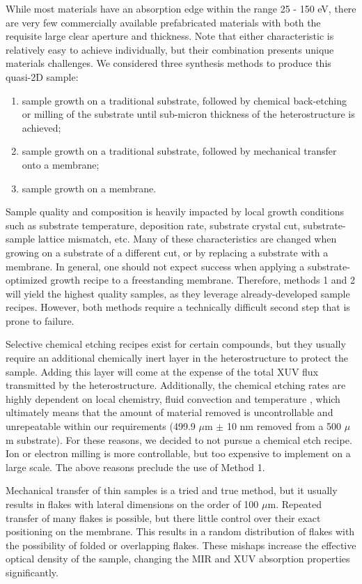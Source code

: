 While most materials have an absorption edge within the range 25 - 150 eV, there are very few commercially available prefabricated materials with both the requisite large clear aperture and thickness. Note that either characteristic is relatively easy to achieve individually, but their combination presents unique materials challenges. We considered three synthesis methods to produce this quasi-2D sample:
\begin{enumerate}
	\item sample growth on a traditional substrate, followed by chemical back-etching or milling of the substrate until sub-micron thickness of the heterostructure is achieved;
	\item sample growth on a traditional substrate, followed by mechanical transfer onto a membrane;
	\item sample growth on a membrane.
\end{enumerate}
Sample quality and composition is heavily impacted by local growth conditions such as substrate temperature, deposition rate, substrate crystal cut, substrate-sample lattice mismatch, etc. Many of these characteristics are changed when growing on a substrate of a different cut, or by replacing a substrate with a membrane. In general, one should not expect success when applying a substrate-optimized growth recipe to a freestanding membrane. Therefore, methods 1 and 2 will yield the highest quality samples, as they leverage already-developed sample recipes. However, both methods require a technically difficult second step that is prone to failure.

Selective chemical etching recipes exist for certain compounds, but they usually require an additional chemically inert layer in the heterostructure to protect the sample. Adding this layer will come at the expense of the total XUV flux transmitted by the heterostructure. Additionally, the chemical etching rates are highly dependent on local chemistry, fluid convection and temperature \cite{chiuPhotoluminescenceEvolutionGaAs2015}, which ultimately means that the amount of material removed is uncontrollable and unrepeatable within our requirements (499.9 $\mu$m $\pm$ 10 nm removed from a 500 $\mu$m substrate). For these reasons, we decided to not pursue a chemical etch recipe. Ion or electron milling is more controllable, but too expensive to implement on a large scale. The above reasons preclude the use of Method 1.

Mechanical transfer of thin samples is a tried and true method, but it usually results in flakes with lateral dimensions on the order of 100 $\mu$m. Repeated transfer of many flakes is possible, but there little control over their exact positioning on the membrane. This results in a random distribution of flakes with the possibility of folded or overlapping flakes. These mishaps increase the effective optical density of the sample, changing the MIR and XUV absorption properties significantly.

